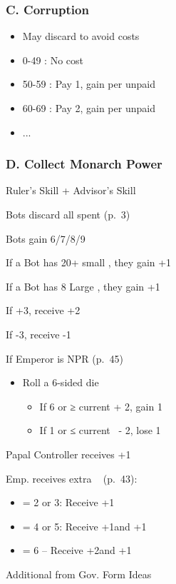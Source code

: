 \documentclass[10pt]{article}
\begin{document}
\subsubsection*{C. Corruption}
\begin{itemize}
	\item May discard \ducats to avoid costs
	\item 0-49 \ducats: No cost
	\item 50-59 \ducats: Pay 1\adminpower, gain \interest per unpaid \adminpower
	\item 60-69 \ducats: Pay 2\adminpower, gain \interest per unpaid \adminpower
	\item ...
\end{itemize}

\subsubsection*{D. Collect Monarch Power}
\begin{itemize}
	\item Ruler's Skill + Advisor's Skill
	{\botrules
	\item Bots discard all spent \botpower (p.~3)
	\item Bots gain 6/7/8/9 \botpower
	\item If a Bot has 20+ small \towns, they gain +1\botpower
	\item If a Bot has 8 Large \towns, they gain +1\botpower
	}
	\item If +3\stability, receive +2\monarchpower
	\item If -3\stability, receive -1\monarchpower
	\item If Emperor is NPR (p.~45) 
	\begin{itemize}
		\item Roll a 6-sided die
		\begin{itemize}
			\item If 6 or ≥ current \authority + 2, gain 1\authority
			\item If 1 or ≤ current \authority~- 2, lose 1\authority
		\end{itemize}
	\end{itemize}
	\item Papal Controller receives +1\diplopower {}
	\item Emp. receives extra \monarchpower~ (p.~43):
	\begin{itemize}
		\item \authority = 2 or 3: Receive +1\diplopower
		\item \authority = 4 or 5: Receive +1\diplopower and +1\milpower
		\item \authority = 6 – Receive +2\diplopower and +1\milpower
	\end{itemize}
  \item Additional \monarchpower from Gov. Form Ideas
\end{itemize}
\end{document}
